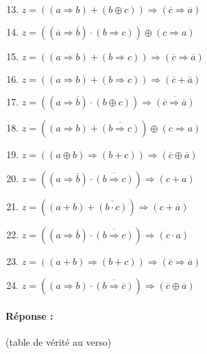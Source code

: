 \documentclass[11pt,a4paper]{article}
\begin{document}
\begin{minipage}[t]{7cm}
\begin{enumerate}\setcounter{enumi}{12}
\item $z = ((a \Rightarrow b) + (b \oplus c)) \Rightarrow (\overline{c} \Rightarrow \overline{a})$
\item $z = ((\overline{a} \Rightarrow \overline{b}) \cdot (b \Rightarrow c)) \oplus ({c} \Rightarrow {a})$
\item $z = ((a \Rightarrow b) + (b \Rightarrow c)) \Rightarrow (\overline{c} \Rightarrow \overline{a})$
\item $z = ((a \Rightarrow b) + (b \Rightarrow c)) \Rightarrow (\overline{c} + \overline{a})$
\item $z = ((a \Rightarrow \overline{b}) \cdot (b \oplus c)) \Rightarrow \overline{(\overline{c} \Rightarrow \overline{a})}$
\item $z = (({a} \Rightarrow {b}) + \overline{(b \Rightarrow c)}) \oplus ({c} \Rightarrow {a})$
\item $z = ((a \oplus b) \Rightarrow (b + c)) \Rightarrow (\overline{c} \oplus \overline{a})$
\item $z = ((a \Rightarrow \overline{b}) \cdot \overline{(b \Rightarrow c)}) \Rightarrow ({c} + {a})$
\item $z = ({(a + b)} + \overline{(b \cdot c)}) \Rightarrow ({c} + \overline{a})$
\item $z = ((a \Rightarrow \overline{b}) \cdot \overline{(b \Rightarrow c)}) \Rightarrow ({c} \cdot {a})$
\item $z = ((a + b) \Rightarrow (b + c)) \Rightarrow (\overline{c} \Rightarrow \overline{a})$
\item $z = ({(a \Rightarrow b)} \cdot \overline{(b \Rightarrow \overline{c})}) \Rightarrow (\overline{c} \oplus \overline{a})$ 
\end{enumerate}
\end{minipage}

\paragraph{Réponse :} (table de vérité au verso)

\newpage
\end{document}
